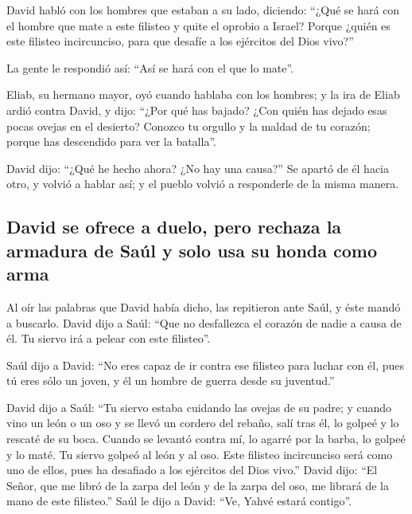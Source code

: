\begin{paracol}{2}
 David habló con los hombres que estaban a su lado,
diciendo: ``¿Qué se hará con el hombre que mate a este filisteo y quite
el oprobio a Israel? Porque ¿quién es este filisteo incircunciso, para
que desafíe a los ejércitos del Dios vivo?''

 La gente le respondió así: ``Así se hará con el que lo
mate''.

 Eliab, su hermano mayor, oyó cuando hablaba con los
hombres; y la ira de Eliab ardió contra David, y dijo: ``¿Por qué has
bajado? ¿Con quién has dejado esas pocas ovejas en el desierto? Conozco
tu orgullo y la maldad de tu corazón; porque has descendido para ver la
batalla''.

 David dijo: ``¿Qué he hecho ahora? ¿No hay una causa?''
 Se apartó de él hacia otro, y volvió a hablar así; y el
pueblo volvió a responderle de la misma manera.

\hypertarget{david-se-ofrece-a-duelo-pero-rechaza-la-armadura-de-sauxfal-y-solo-usa-su-honda-como-arma}{%
\subsection{David se ofrece a duelo, pero rechaza la armadura de Saúl y
solo usa su honda como
arma}\label{david-se-ofrece-a-duelo-pero-rechaza-la-armadura-de-sauxfal-y-solo-usa-su-honda-como-arma}}

 Al oír las palabras que David había dicho, las
repitieron ante Saúl, y éste mandó a buscarlo.  David
dijo a Saúl: ``Que no desfallezca el corazón de nadie a causa de él. Tu
siervo irá a pelear con este filisteo''.

 Saúl dijo a David: ``No eres capaz de ir contra ese
filisteo para luchar con él, pues tú eres sólo un joven, y él un hombre
de guerra desde su juventud.''

 David dijo a Saúl: ``Tu siervo estaba cuidando las
ovejas de su padre; y cuando vino un león o un oso y se llevó un cordero
del rebaño,  salí tras él, lo golpeé y lo rescaté de su
boca. Cuando se levantó contra mí, lo agarré por la barba, lo golpeé y
lo maté.  Tu siervo golpeó al león y al oso. Este
filisteo incircunciso será como uno de ellos, pues ha desafiado a los
ejércitos del Dios vivo.''  David dijo: ``El Señor, que
me libró de la zarpa del león y de la zarpa del oso, me librará de la
mano de este filisteo.'' Saúl le dijo a David: ``Ve, Yahvé estará
contigo''.


\end{paracol}
